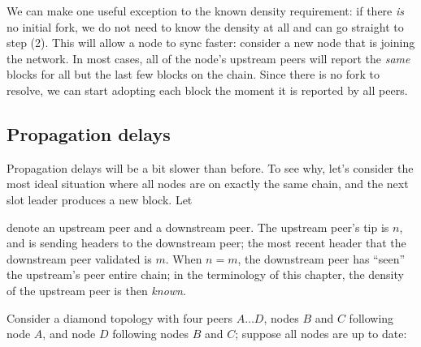 We can make one useful exception to the known density requirement:
if there \emph{is} no initial fork, we do not need to know the density at
all and can go straight to step (2). This will allow a node to sync faster:
consider a new node that is joining the network. In most cases, all of the
node's upstream peers will report the \emph{same} blocks for all but the last
few blocks on the chain. Since there is no fork to resolve, we can start
adopting each block the moment it is reported by all peers.

\pagebreak
\subsection{Propagation delays}

Propagation delays will be a bit slower than before. To see why, let's consider
the most ideal situation where all nodes are on exactly the same chain, and
the next slot leader produces a new block. Let
%
\begin{center}
\end{center}
%
denote an upstream peer and a downstream peer. The upstream peer's tip is $n$,
and is sending headers to the downstream peer; the most recent header that the
downstream peer validated is $m$. When $n = m$, the downstream peer has ``seen''
the upstream's peer entire chain; in the terminology of this chapter, the
density of the upstream peer is then \emph{known}.

Consider a diamond topology with four peers $A \ldots D$, nodes $B$ and $C$
following node $A$, and node $D$ following nodes $B$ and $C$; suppose all nodes
are up to date:

\begin{center}
\end{center}


